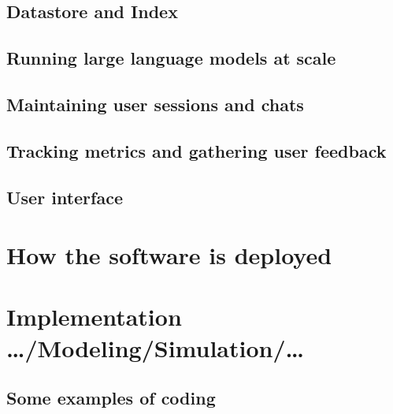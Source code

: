 \subsection{Datastore and Index}


\subsection{Running large language models at scale}


\subsection{Maintaining user sessions and chats}


\subsection{Tracking metrics and gathering user feedback}


\subsection{User interface}


\section{How the software is deployed}











\section{Implementation …/Modeling/Simulation/…}
\label{sec:implementationDetails}


\subsection{Some examples of coding}


